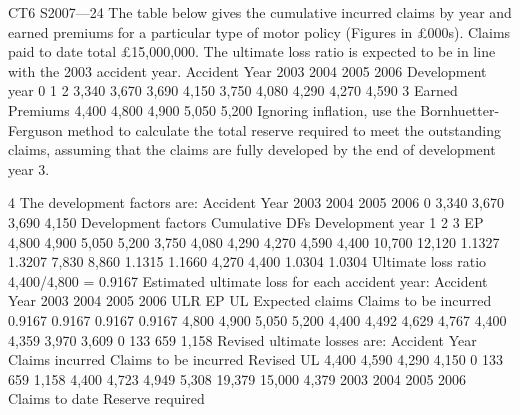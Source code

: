 \documentclass[a4paper,12pt]{article}
\begin{document}
CT6 S2007—24
The table below gives the cumulative incurred claims by year and earned premiums
for a particular type of motor policy (Figures in £000s).
Claims paid to date total £15,000,000. The ultimate loss ratio is expected to be in line
with the 2003 accident year.
Accident
Year
2003
2004
2005
2006
Development year
0
1
2
3,340
3,670
3,690
4,150
3,750
4,080
4,290
4,270
4,590
3
Earned
Premiums
4,400
4,800
4,900
5,050
5,200
Ignoring inflation, use the Bornhuetter-Ferguson method to calculate the total reserve
required to meet the outstanding claims, assuming that the claims are fully developed
by the end of development year 3.

4
The development factors are:
Accident
Year
2003
2004
2005
2006
0
3,340
3,670
3,690
4,150
Development factors
Cumulative DFs
Development year
1
2
3 EP
4,800
4,900
5,050
5,200
3,750
4,080
4,290 4,270
4,590 4,400
10,700
12,120
1.1327
1.3207 7,830
8,860
1.1315
1.1660 4,270
4,400
1.0304
1.0304
Ultimate loss ratio
4,400/4,800 = 0.9167
Estimated ultimate loss for each accident year:
Accident
Year
2003
2004
2005
2006
ULR EP UL Expected
claims Claims to be
incurred
0.9167
0.9167
0.9167
0.9167 4,800
4,900
5,050
5,200 4,400
4,492
4,629
4,767 4,400
4,359
3,970
3,609 0
133
659
1,158
Revised ultimate losses are:
Accident
Year
Claims
incurred Claims to be
incurred Revised UL
4,400
4,590
4,290
4,150 0
133
659
1,158 4,400
4,723
4,949
5,308
19,379
15,000
4,379
2003
2004
2005
2006
Claims to date
Reserve required
\end{document}
